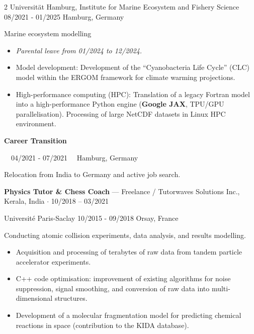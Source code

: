 \documentclass{thejus_cv}
\begin{document}
\begin{paracol}{2}
             {Universit\"at Hamburg, Institute for Marine Ecosystem and Fishery Science}
             {08/2021 - 01/2025}
             {Hamburg, Germany}
             {Marine ecosystem modelling
             \begin{itemize}\setlength{\itemsep}{0.05em}
                 \item \textit{Parental leave from 01/2024 to 12/2024.}
                 \item Model development: Development of the ``Cyanobacteria Life Cycle'' (CLC) model within the ERGOM framework for climate warming projections.
                 \item High-performance computing (HPC): Translation of a legacy Fortran model into a high-performance Python engine (\textbf{Google JAX}, TPU/GPU parallelisation). Processing of large NetCDF datasets in Linux HPC environment.
             \end{itemize}}

\vspace{1.5em}
{\large\textbf{Career Transition}}\par
{\small\color{cvgray}\faCalendar\ \ 04/2021 - 07/2021 \hspace{0.5cm} \faMapMarker\ \ Hamburg, Germany}\par
\vspace{0.2em}
{\color{cvlightgray}\hdashrule{\linewidth}{0.5pt}{1mm}}\par
\vspace{0.2em}
Relocation from India to Germany and active job search.
\vspace{0.3em}

\textbf{Physics Tutor \& Chess Coach} --- Freelance / Tutorwaves Solutions Inc., Kerala, India $\cdot$ 10/2018 -- 03/2021\par

             {Universit\'e Paris-Saclay}
             {10/2015 - 09/2018}
             {Orsay, France}
             {Conducting atomic collision experiments, data analysis, and results modelling.
             \begin{itemize}
                 \item Acquisition and processing of terabytes of raw data from tandem particle accelerator experiments.
                 \item C++ code optimisation: improvement of existing algorithms for noise suppression, signal smoothing, and conversion of raw data into multi-dimensional structures.
                 \item Development of a molecular fragmentation model for predicting chemical reactions in space (contribution to the KIDA database).
             \end{itemize}}



\end{paracol}
\end{document}
